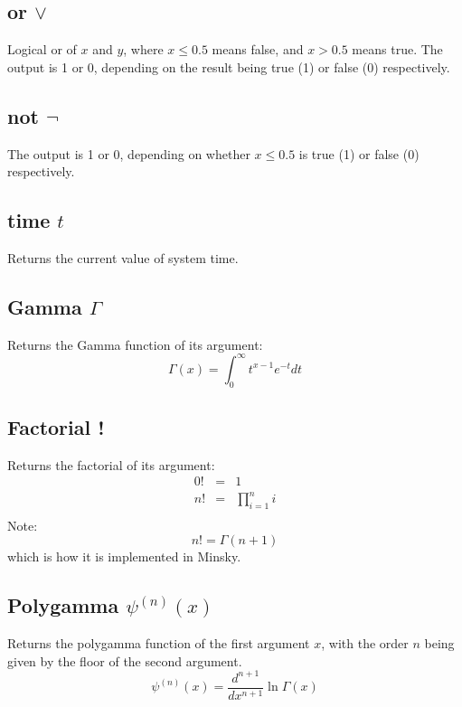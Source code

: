 \subsection{or $\vee$}\label{Operation:or_} Logical or of $x$ and $y$, where $x\le0.5$
means false, and $x>0.5$ means true. The output is 1 or 0, depending
on the result being true (1) or false (0) respectively.

\subsection{not $\neg$}\label{Operation:not_} The output is 1 or 0, depending
on whether $x\le0.5$ is true (1) or false (0) respectively.

\subsection{time $t$}\label{Operation:time}  Returns the current value
of system time.

\subsection{Gamma $\Gamma$}\label{Operation:Gamma} Returns the Gamma
function of its argument:
\begin{displaymath}
  \Gamma(x)=\int_0^\infty t^{x-1}e^{-t}dt
\end{displaymath}

\subsection{Factorial !}\label{Operation:fact} Returns the factorial
of its argument:
\begin{eqnarray*}
  0!&=&1\\
  n! &=& \prod_{i=1}^n i\\
\end{eqnarray*}
Note:
\begin{displaymath}
  n!=\Gamma(n+1)
\end{displaymath}
which is how it is implemented in Minsky.

\subsection{Polygamma $\psi^{(n)}(x)$}\label{Operation:polygamma} Returns the polygamma function
of the first argument $x$, with the order $n$ being given by the floor
of the second argument.
\begin{displaymath}
  \psi^{(n)}(x)=\frac{d^{n+1}}{dx^{n+1}}\ln\Gamma(x)
\end{displaymath}

